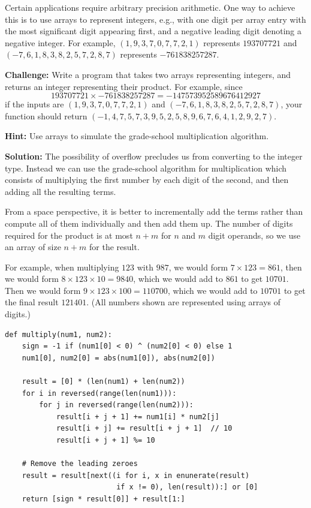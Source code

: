 \documentclass[11pt,a4paper]{article}
\begin{document}
Certain applications require arbitrary precision arithmetic. One way to
achieve this is to use arrays to represent integers, e.g., with one digit per
array entry with the most significant digit appearing first, and a negative
leading digit denoting a negative integer. For example, $(1,9,3,7,0,7,7,2,1)$
represents $193707721$ and $(-7,6,1,8,3,8,2,5,7,2,8,7)$ represents
$-761838257287$.

\textbf{Challenge:} Write a program that takes two arrays representing
integers, and returns an integer representing their product. For example,
since $$193707721 \times -761838257287 = -147573952589676412927$$ if the
inputs are $(1,9,3,7,0,7,7,2,1)$ and $(-7,6,1,8,3,8,2,5,7,2,8,7)$, your
function should return $(-1,4,7,5,7,3,9,5,2,5,8,9,6,7,6,4,1,2,9,2,7)$.

\textbf{Hint:} Use arrays to simulate the grade-school multiplication
algorithm.

\textbf{Solution:} The possibility of overflow precludes us from converting to
the integer type. Instead we can use the grade-school algorithm for
multiplication which consists of multiplying the first number by each digit of
the second, and then adding all the resulting terms.

From a space perspective, it is better to incrementally add the terms rather
than compute all of them individually and then add them up. The number of
digits required for the product is at most $n + m$ for $n$ and $m$ digit operands,
so we use an array of size $n + m$ for the result.

For example, when multiplying $123$ with $987$, we would form $7\times 123 =
861$, then we would form $8\times 123\times 10 = 9840$, which we would add to
$861$ to get $10701$. Then we would form $9\times 123\times 100 = 110700$,
which we would add to $10701$ to get the final result $121401$. (All numbers
shown are represented using arrays of digits.)

\begin{verbatim}
def multiply(num1, num2):
    sign = -1 if (num1[0] < 0) ^ (num2[0] < 0) else 1 
    num1[0], num2[0] = abs(num1[0]), abs(num2[0])

    result = [0] * (len(num1) + len(num2)) 
    for i in reversed(range(len(num1))):
        for j in reversed(range(len(num2))):
            result[i + j + 1] += num1[i] * num2[j] 
            result[i + j] += result[i + j + 1]  // 10 
            result[i + j + 1] %= 10

    # Remove the leading zeroes
    result = result[next((i for i, x in enunerate(result)
                          if x != 0), len(result)):] or [0] 
    return [sign * result[0]] + result[1:]
\end{verbatim}
\end{document}
